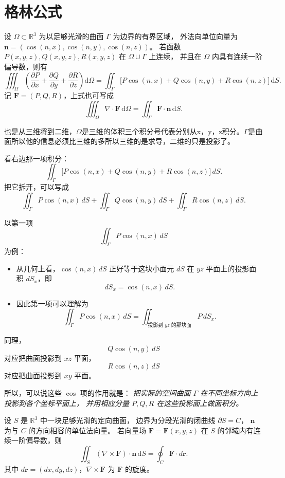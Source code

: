 \section{格林公式}
\begin{definition}[格林公式]
设 $\Omega\subset\mathbb{R}^3$ 为以足够光滑的曲面 $\Gamma$ 为边界的有界区域，
外法向单位向量为 $\bm n=(\cos(n,x),\cos(n,y),\cos(n,z))$。
若函数 $P(x,y,z),Q(x,y,z),R(x,y,z)$ 在 $\Omega\cup\Gamma$ 上连续，
并且在 $\Omega$ 内具有连续一阶偏导数，则有
\[
\iiint_{\Omega}
\left(
  \frac{\partial P}{\partial x}
 +\frac{\partial Q}{\partial y}
 +\frac{\partial R}{\partial z}
\right)\mathrm d\Omega
=
\iint_{\Gamma}
\bigl[P\cos(n,x)+Q\cos(n,y)+R\cos(n,z)\bigr]\,\mathrm dS .
\]
记 $\mathbf{F}=(P,Q,R)$，上式也可写成
\[
\iiint_{\Omega} \nabla\!\cdot\!\mathbf{F}\,\mathrm d\Omega
= \iint_{\Gamma} \mathbf{F}\cdot\bm n\,\mathrm dS .
\]
\end{definition}
\begin{note}
    也是从三维将到二维，$\Omega$是三维的体积三个积分号代表分别从x，y，z积分。$\Gamma$是曲面所以他的信息必须比三维的多所以三维的是求导，二维的只是投影了。
\end{note}
\begin{note}
看右边那一项积分：
\[
\iint_{\Gamma}\bigl[P\cos(n,x)+Q\cos(n,y)+R\cos(n,z)\bigr]\,dS.
\]
把它拆开，可以写成
\[
\iint_{\Gamma}P\cos(n,x)\,dS
+
\iint_{\Gamma}Q\cos(n,y)\,dS
+
\iint_{\Gamma}R\cos(n,z)\,dS.
\]

以第一项
\[
\iint_{\Gamma}P\cos(n,x)\,dS
\]
为例：

\begin{itemize}
  \item 从几何上看，$\cos(n,x)\,dS$ 正好等于这块小面元 $dS$
        在 $yz$ 平面上的投影面积 $dS_x$，即
        \[
        dS_x = \cos(n,x)\,dS.
        \]
  \item 因此第一项可以理解为
        \[
        \iint_{\Gamma}P\cos(n,x)\,dS
        = \iint_{\text{投影到 }yz\text{ 的那块面}} P\,dS_x.
        \]
\end{itemize}

同理，
\[
Q\cos(n,y)\,dS
\]
对应把曲面投影到 $xz$ 平面，
\[
R\cos(n,z)\,dS
\]
对应把曲面投影到 $xy$ 平面。

所以，可以说这些 $\cos$ 项的作用就是：
\emph{把实际的空间曲面 $\Gamma$ 在不同坐标方向上投影到各个坐标平面上，
并用相应分量 $P,Q,R$ 在这些投影面上做面积分。}
\end{note}
\begin{definition}[Stokes 公式]
设 $S$ 是 $\mathbb R^3$ 中一块足够光滑的定向曲面，
边界为分段光滑的闭曲线 $\partial S = C$，
$\mathbf n$ 为与 $C$ 的方向相容的单位法向量。
若向量场 $\mathbf F=\mathbf F(x,y,z)$ 在 $S$ 的邻域内有连续一阶偏导数，则
\[
\iint_{S} (\nabla\times\mathbf F)\cdot\mathbf n\,\mathrm dS
=
\oint_{C} \mathbf F\cdot d\mathbf r.
\]
其中 $d\mathbf r = (dx,dy,dz)$，$\nabla\times\mathbf F$ 为 $\mathbf F$ 的旋度。
\end{definition}
